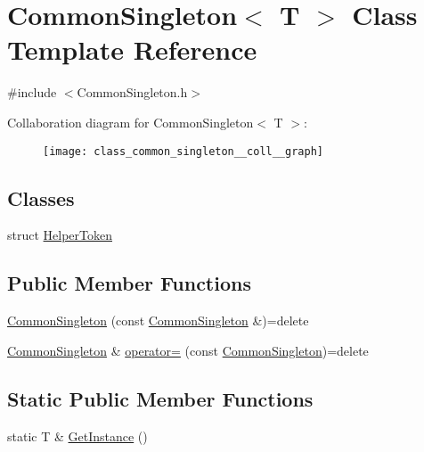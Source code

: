 \hypertarget{class_common_singleton}{}\section{Common\+Singleton$<$ T $>$ Class Template Reference}
\label{class_common_singleton}


{\ttfamily \#include $<$Common\+Singleton.\+h$>$}



Collaboration diagram for Common\+Singleton$<$ T $>$\+:\nopagebreak
\begin{figure}[H]
\begin{center}
\leavevmode
\texttt{[image: class\_common\_singleton\_\_coll\_\_graph]}
\end{center}
\end{figure}
\subsection*{Classes}
\begin{DoxyCompactItemize}
\item 
struct \mbox{\hyperlink{struct_common_singleton_1_1_helper_token}{Helper\+Token}}
\end{DoxyCompactItemize}
\subsection*{Public Member Functions}
\begin{DoxyCompactItemize}
\item 
\mbox{\hyperlink{class_common_singleton_a00a83433e7f0b2895e436a8426ff5044}{Common\+Singleton}} (const \mbox{\hyperlink{class_common_singleton}{Common\+Singleton}} \&)=delete
\item 
\mbox{\hyperlink{class_common_singleton}{Common\+Singleton}} \& \mbox{\hyperlink{class_common_singleton_a4f30b3cc1365df03a07b04cb4095d6f0}{operator=}} (const \mbox{\hyperlink{class_common_singleton}{Common\+Singleton}})=delete
\end{DoxyCompactItemize}
\subsection*{Static Public Member Functions}
\begin{DoxyCompactItemize}
\item 
static T \& \mbox{\hyperlink{class_common_singleton_a77cfefba5f8a8a3302851c40bfc51e38}{Get\+Instance}} ()
\end{DoxyCompactItemize}
